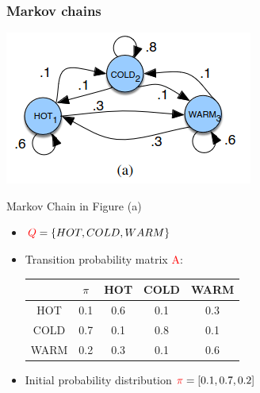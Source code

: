 \documentclass[13.5pt,aspecratio=169]{beamer}
\begin{document}
\begin{frame}
    \onehalfspacing
        \frametitle{Markov chains}
        
        \begin{minipage}{0.5\textwidth}
            \includegraphics[scale=0.7]{Example_1.png}
        \end{minipage}
        \begin{minipage}{0.49\textwidth}
            \begin{block}{}
                Markov Chain in Figure (a)
            \end{block}

            \begin{itemize}
                \item $\textcolor{red}{Q} = \{HOT, COLD, WARM \} $ 
                \item Transition probability matrix \textcolor{red}{A}: 
                \hspace*{-1cm}
                {
                \small
                \begin{tabular}{c|cccc}
                    $ $ & $\pi$ & HOT & COLD & WARM \\
                    \hline
                    HOT & 0.1 & 0.6 & 0.1 & 0.3 \\
                    COLD & 0.7 & 0.1 & 0.8 & 0.1\\
                    WARM & 0.2 & 0.3 & 0.1 & 0.6 \\
                \end{tabular}
                }
                \item Initial probability distribution $\textcolor{red}{\pi} = [0.1,0.7,0.2]$
                
            \end{itemize}

        \end{minipage}
        
\end{frame}
\end{document}
